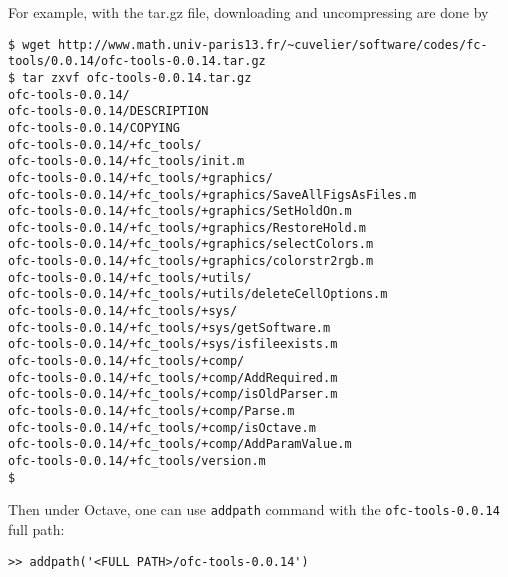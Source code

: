 For example, with the tar.gz file, downloading and uncompressing are done by 
\begin{verbatim}
$ wget http://www.math.univ-paris13.fr/~cuvelier/software/codes/fc-tools/0.0.14/ofc-tools-0.0.14.tar.gz
$ tar zxvf ofc-tools-0.0.14.tar.gz
ofc-tools-0.0.14/
ofc-tools-0.0.14/DESCRIPTION
ofc-tools-0.0.14/COPYING
ofc-tools-0.0.14/+fc_tools/
ofc-tools-0.0.14/+fc_tools/init.m
ofc-tools-0.0.14/+fc_tools/+graphics/
ofc-tools-0.0.14/+fc_tools/+graphics/SaveAllFigsAsFiles.m
ofc-tools-0.0.14/+fc_tools/+graphics/SetHoldOn.m
ofc-tools-0.0.14/+fc_tools/+graphics/RestoreHold.m
ofc-tools-0.0.14/+fc_tools/+graphics/selectColors.m
ofc-tools-0.0.14/+fc_tools/+graphics/colorstr2rgb.m
ofc-tools-0.0.14/+fc_tools/+utils/
ofc-tools-0.0.14/+fc_tools/+utils/deleteCellOptions.m
ofc-tools-0.0.14/+fc_tools/+sys/
ofc-tools-0.0.14/+fc_tools/+sys/getSoftware.m
ofc-tools-0.0.14/+fc_tools/+sys/isfileexists.m
ofc-tools-0.0.14/+fc_tools/+comp/
ofc-tools-0.0.14/+fc_tools/+comp/AddRequired.m
ofc-tools-0.0.14/+fc_tools/+comp/isOldParser.m
ofc-tools-0.0.14/+fc_tools/+comp/Parse.m
ofc-tools-0.0.14/+fc_tools/+comp/isOctave.m
ofc-tools-0.0.14/+fc_tools/+comp/AddParamValue.m
ofc-tools-0.0.14/+fc_tools/version.m
$
\end{verbatim}
Then under Octave, one can use \texttt{addpath} command with the \texttt{ofc-tools-0.0.14} full path:
\begin{verbatim}
>> addpath('<FULL PATH>/ofc-tools-0.0.14')
\end{verbatim}
 






